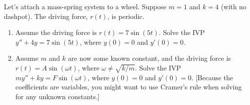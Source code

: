 \begin{problem}%
Let's attach a mass-spring system to a wheel. Suppose $m=1$ and $k=4$ (with no dashpot). 
The driving force, $r(t)$, is periodic. 
\begin{enumerate}
 \item Assume the driving force is $r(t) = 7\sin(5t)$. Solve the IVP $y''+4y=7\sin(5t)$, where $y(0)=0$ and $y'(0)=0$. 
 \item
Assume $m$ and $k$ are now some known constant, and the driving force is $r(t) = A\sin(\omega t)$, where $\omega\neq \sqrt{k/m}$. Solve the IVP $my''+ky=F\sin(\omega t)$, where $y(0)=0$ and $y'(0)=0$. [Because the coefficients are variables, you might want to use Cramer's rule when solving for any unknown constants.]
\end{enumerate}
\end{problem}


